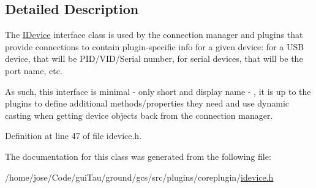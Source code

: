 \subsection{Detailed Description}
The \hyperlink{class_core_1_1_i_device}{I\-Device} interface class is used by the connection manager and plugins that provide connections to contain plugin-\/specific info for a given device\-: for a U\-S\-B device, that will be P\-I\-D/\-V\-I\-D/\-Serial number, for serial devices, that will be the port name, etc.

As such, this interface is minimal -\/ only short and display name -\/ , it is up to the plugins to define additional methods/properties they need and use dynamic casting when getting device objects back from the connection manager. 

Definition at line 47 of file idevice.\-h.



The documentation for this class was generated from the following file\-:\begin{DoxyCompactItemize}
\item 
/home/jose/\-Code/gui\-Tau/ground/gcs/src/plugins/coreplugin/\hyperlink{idevice_8h}{idevice.\-h}\end{DoxyCompactItemize}
